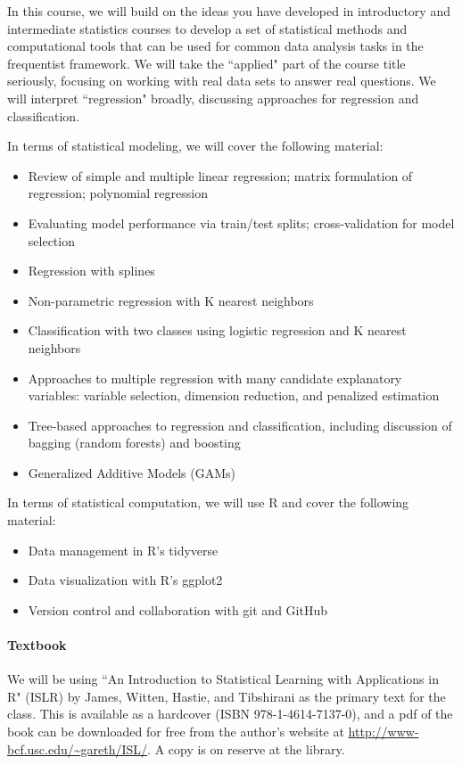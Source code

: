 \documentclass[11pt]{article}
\begin{document}
In this course, we will build on the ideas you have developed in introductory and intermediate statistics courses to develop a set of statistical methods and computational tools that can be used for common data analysis tasks in the frequentist framework.  We will take the ``applied" part of the course title seriously, focusing on working with real data sets to answer real questions.  We will interpret ``regression" broadly, discussing approaches for regression and classification.

In terms of statistical modeling, we will cover the following material:
\begin{itemize}
  \item Review of simple and multiple linear regression; matrix formulation of regression; polynomial regression
  \item Evaluating model performance via train/test splits; cross-validation for model selection
  \item Regression with splines
  \item Non-parametric regression with K nearest neighbors
  \item Classification with two classes using logistic regression and K nearest neighbors
  \item Approaches to multiple regression with many candidate explanatory variables: variable selection, dimension reduction, and penalized estimation
  \item Tree-based approaches to regression and classification, including discussion of bagging (random forests) and boosting
  \item Generalized Additive Models (GAMs)
\end{itemize}

In terms of statistical computation, we will use R and cover the following material:
\begin{itemize}
  \item Data management in R's tidyverse
  \item Data visualization with R's ggplot2
  \item Version control and collaboration with git and GitHub
\end{itemize}

\paragraph{Textbook}

We will be using ``An Introduction to Statistical Learning with Applications in R" (ISLR) by James, Witten, Hastie, and Tibshirani as the primary text for the class.  This is available as a hardcover (ISBN 978-1-4614-7137-0), and a pdf of the book can be downloaded for free from the author's website at \url{http://www-bcf.usc.edu/~gareth/ISL/}.
A copy is on reserve at the library.
\end{document}
